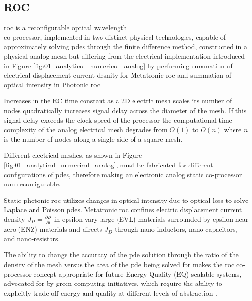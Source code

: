 \subsection {ROC}

\acrfull{roc} is a reconfigurable optical wavelength \\ \gls{co-processor}, implemented in two distinct physical technologies, capable of approximately solving \acrshort{pde}s through the \gls{finite difference method}, constructed in a physical analog mesh but differing from the electrical implementation introduced in Figure \ref{fig:01_analytical_numerical_analog} by performing summation of electrical \gls{displacement current} desnity for \gls{Metatronic} \acrshort{roc} and summation of \gls{optical intensity} in \gls{Photonic} \acrshort{roc}. 

\par Increases in the \gls{RC time constant} as a 2D electric mesh scales its number of nodes quadratically increases signal delay across the diameter of the mesh. If this signal delay exceeds the clock speed of the processor the computational time complexity of the analog electrical mesh degrades from $O(1)$ to $O(n)$ where $n$ is the number of nodes along a single side of a square mesh.

\par Different electrical meshes, as shown in Figure \ref{fig:01_analytical_numerical_analog}, must be fabricated for different configurations of \acrshort{pde}s, therefore making an electronic analog static co-processor non reconfigurable.

\par Static photonic \acrshort{roc} utilizes changes in optical intensity due to optical loss to solve Laplace and Poisson \acrshort{pde}s. \gls{Metatronic} \acrshort{roc} confines electric displacement current density $J_D = \frac{\partial D}{\partial t}$ in epsilon vary large (EVL) materials surrounded by epsilon near zero (ENZ) materials and directs $J_D$ through nano-inductors, nano-capacitors, and nano-resistors.

\par The ability to change the accuracy of the \acrshort{pde} solution through the ratio of the density of the mesh versus the area of the \acrshort{pde} being solved for makes the \acrshort{roc} co-processor concept appropriate for future Energy-Quality (EQ) scalable systems, advocated for by  green computing initiatives, which require the ability to explicitly trade off energy and quality at different levels of abstraction \cite{M.Alioto_2017}.

